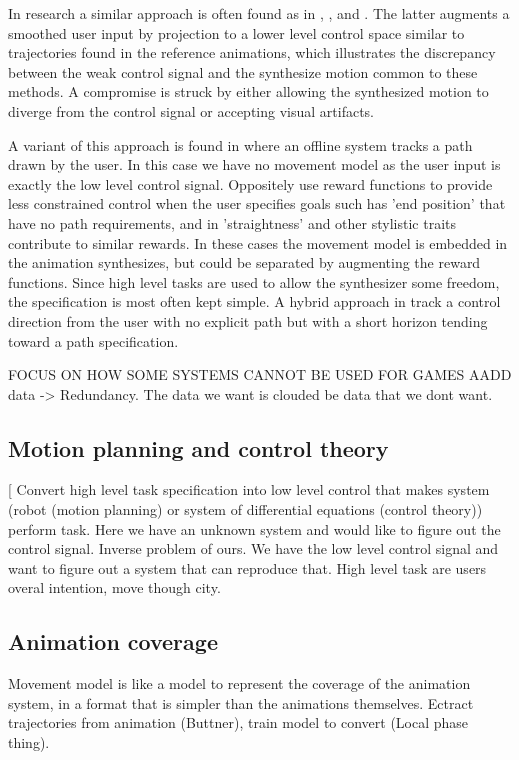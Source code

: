 In research a similar approach is often found as in \citep{mccann07}, \citep{holden.16}, \citep{Zhang18} and \citep{startke20}. The latter augments a smoothed user input by projection to a lower level control space similar to trajectories found in the reference animations, which illustrates the discrepancy between the weak control signal and the synthesize motion common to these methods. A compromise is struck by either allowing the synthesized motion to diverge from the control signal or accepting visual artifacts.

A variant of this approach is found in \citep{treuille07} where an offline system tracks a path drawn by the user. In this case we have no movement model as the user input is exactly the low level control signal. Oppositely \citep{kovar02} use reward functions to provide less constrained control when the user specifies goals such has 'end position' that have no path requirements, and in \citep{lee18} 'straightness' and other stylistic traits contribute to similar rewards. In these cases the movement model is embedded in the animation synthesizes, but could be separated by augmenting the reward functions. Since high level tasks are used to allow the synthesizer some freedom, the specification is most often kept simple. A hybrid approach in \citep{lee10} track a control direction from the user with no explicit path but with a short horizon tending toward a path specification.

FOCUS ON HOW SOME SYSTEMS CANNOT BE USED FOR GAMES
AADD data -> Redundancy. The data we want is clouded be data that we dont want.

\subsection{Motion planning and control theory}
[
Convert high level task specification into low level control that makes system (robot (motion planning) or system of differential equations (control theory)) perform task.
Here we have an unknown system and would like to figure out the control signal. Inverse problem of ours. We have the low level control signal and want to figure out a system that can reproduce that. High level task are users overal intention, move though city.

\subsection{Animation coverage}
Movement model is like a model to represent the coverage of the animation system, in a format that is simpler than the animations themselves. Ectract trajectories from animation (Buttner), train model to convert (Local phase thing). 

